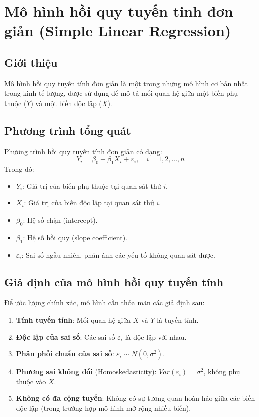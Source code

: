\chapter{Mô hình hồi quy tuyến tinh đơn giản (Simple Linear Regression)}
\section{Giới thiệu}
Mô hình hồi quy tuyến tính đơn giản là một trong những mô hình cơ bản nhất trong kinh tế lượng, được sử dụng để mô tả mối quan hệ giữa một biến phụ thuộc ($Y$) và một biến độc lập ($X$).

\section{Phương trình tổng quát}
Phương trình hồi quy tuyến tính đơn giản có dạng:
\begin{equation}
    Y_i = \beta_0 + \beta_1 X_i + \varepsilon_i, \quad i = 1,2,...,n
\end{equation}
Trong đó:
\begin{itemize}
    \item $Y_i$: Giá trị của biến phụ thuộc tại quan sát thứ $i$.
    \item $X_i$: Giá trị của biến độc lập tại quan sát thứ $i$.
    \item $\beta_0$: Hệ số chặn (intercept).
    \item $\beta_1$: Hệ số hồi quy (slope coefficient).
    \item $\varepsilon_i$: Sai số ngẫu nhiên, phản ánh các yếu tố không quan sát được.
\end{itemize}

\section{Giả định của mô hình hồi quy tuyến tính}
Để ước lượng chính xác, mô hình cần thỏa mãn các giả định sau:
\begin{enumerate}
    \item \textbf{Tính tuyến tính}: Mối quan hệ giữa $X$ và $Y$ là tuyến tính.
    \item \textbf{Độc lập của sai số}: Các sai số $\varepsilon_i$ là độc lập với nhau.
    \item \textbf{Phân phối chuẩn của sai số}: $\varepsilon_i \sim N(0, \sigma^2)$.
    \item \textbf{Phương sai không đổi} (Homoskedasticity): $Var(\varepsilon_i) = \sigma^2$, không phụ thuộc vào $X$.
    \item \textbf{Không có đa cộng tuyến}: Không có sự tương quan hoàn hảo giữa các biến độc lập (trong trường hợp mô hình mở rộng nhiều biến).
\end{enumerate}

